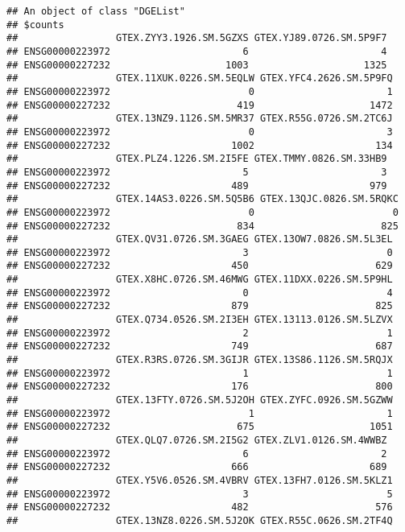 \documentclass[
]{article}
\begin{document}
\begin{verbatim}
## An object of class "DGEList"
## $counts
##                 GTEX.ZYY3.1926.SM.5GZXS GTEX.YJ89.0726.SM.5P9F7
## ENSG00000223972                       6                       4
## ENSG00000227232                    1003                    1325
##                 GTEX.11XUK.0226.SM.5EQLW GTEX.YFC4.2626.SM.5P9FQ
## ENSG00000223972                        0                       1
## ENSG00000227232                      419                    1472
##                 GTEX.13NZ9.1126.SM.5MR37 GTEX.R55G.0726.SM.2TC6J
## ENSG00000223972                        0                       3
## ENSG00000227232                     1002                     134
##                 GTEX.PLZ4.1226.SM.2I5FE GTEX.TMMY.0826.SM.33HB9
## ENSG00000223972                       5                       3
## ENSG00000227232                     489                     979
##                 GTEX.14AS3.0226.SM.5Q5B6 GTEX.13QJC.0826.SM.5RQKC
## ENSG00000223972                        0                        0
## ENSG00000227232                      834                      825
##                 GTEX.QV31.0726.SM.3GAEG GTEX.13OW7.0826.SM.5L3EL
## ENSG00000223972                       3                        0
## ENSG00000227232                     450                      629
##                 GTEX.X8HC.0726.SM.46MWG GTEX.11DXX.0226.SM.5P9HL
## ENSG00000223972                       0                        4
## ENSG00000227232                     879                      825
##                 GTEX.Q734.0526.SM.2I3EH GTEX.13113.0126.SM.5LZVX
## ENSG00000223972                       2                        1
## ENSG00000227232                     749                      687
##                 GTEX.R3RS.0726.SM.3GIJR GTEX.13S86.1126.SM.5RQJX
## ENSG00000223972                       1                        1
## ENSG00000227232                     176                      800
##                 GTEX.13FTY.0726.SM.5J2OH GTEX.ZYFC.0926.SM.5GZWW
## ENSG00000223972                        1                       1
## ENSG00000227232                      675                    1051
##                 GTEX.QLQ7.0726.SM.2I5G2 GTEX.ZLV1.0126.SM.4WWBZ
## ENSG00000223972                       6                       2
## ENSG00000227232                     666                     689
##                 GTEX.Y5V6.0526.SM.4VBRV GTEX.13FH7.0126.SM.5KLZ1
## ENSG00000223972                       3                        5
## ENSG00000227232                     482                      576
##                 GTEX.13NZ8.0226.SM.5J2OK GTEX.R55C.0626.SM.2TF4Q

\end{verbatim}
\end{document}
